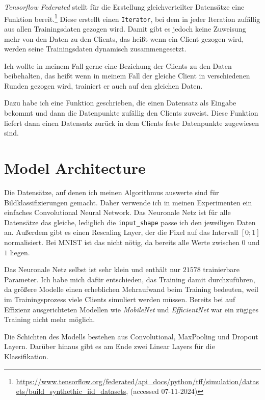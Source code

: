\textit{Tensorflow Federated} stellt für die Erstellung gleichverteilter Datensätze eine Funktion bereit.\footnote{\url{https://www.tensorflow.org/federated/api_docs/python/tff/simulation/datasets/build_synthethic_iid_datasets}, (accessed 07-11-2024)} Diese erstellt einen \texttt{Iterator}, bei dem in jeder Iteration zufällig aus allen Trainingsdaten gezogen wird. Damit gibt es jedoch keine Zuweisung mehr von den Daten zu den Clients, das heißt wenn ein Client gezogen wird, werden seine Trainingsdaten dynamisch zusammengesetzt.

Ich wollte in meinem Fall gerne eine Beziehung der Clients zu den Daten beibehalten, das heißt wenn in meinem Fall der gleiche Client in verschiedenen Runden gezogen wird, trainiert er auch auf den gleichen Daten.

Dazu habe ich eine Funktion geschrieben, die einen Datensatz als Eingabe bekommt und dann die Datenpunkte zufällig den Clients zuweist. Diese Funktion liefert dann einen Datensatz zurück in dem Clients feste Datenpunkte zugewiesen sind.

\section{Model Architecture}
Die Datensätze, auf denen ich meinen Algorithmus auswerte sind für Bildklassifizierungen gemacht. Daher verwende ich in meinen Experimenten ein einfaches Convolutional Neural Network. Das Neuronale Netz ist für alle Datensätze das gleiche, lediglich die \texttt{input\_shape} passe ich den jeweiligen Daten an. Außerdem gibt es einen Rescaling Layer, der die Pixel auf das Intervall $[0;1]$ normalisiert. Bei MNIST ist das nicht nötig, da bereits alle Werte zwischen $0$ und $1$ liegen.

Das Neuronale Netz selbst ist sehr klein und enthält nur $21578$ trainierbare Parameter. Ich habe mich dafür entschieden, das Training damit durchzuführen, da größere Modelle einen erheblichen Mehraufwand beim Training bedeuten, weil im Trainingsprozess viele Clients simuliert werden müssen. Bereits bei auf Effizienz ausgerichteten Modellen wie \textit{MobileNet} \cite{howard:2017} und \textit{EfficientNet} \cite{tan:2019} war ein zügiges Training nicht mehr möglich.

Die Schichten des Modells bestehen aus Convolutional, MaxPooling und Dropout Layern. Darüber hinaus gibt es am Ende zwei Linear Layers für die Klassifikation.

